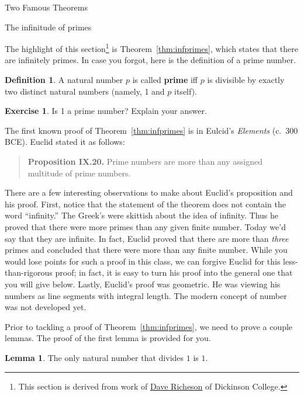 \documentclass[11pt]{article}
\theoremstyle{definition}
\newtheorem{definition}[theorem]{Definition}
\newtheorem{exercise}[theorem]{Exercise}
\newtheorem{lemma}[theorem]{Lemma}
\begin{document}
\addtocounter{section}{3}

\begin{section}{Two Famous Theorems}

\begin{subsection}{The infinitude of primes}

The highlight of this section\footnote{This section is derived from work of \href{http://users.dickinson.edu/~richesod/}{Dave Richeson} of Dickinson College.} is Theorem~\ref{thm:infprimes}, which states that there are infinitely primes. In case you forgot, here is the definition of a prime number.

\begin{definition}
A natural number $p$ is called \textbf{prime} iff $p$ is divisible by exactly two distinct natural numbers (namely, 1 and $p$ itself).
\end{definition}

\begin{exercise}
Is 1 a prime number?  Explain your answer.
\end{exercise}

The first known proof of Theorem~\ref{thm:infprimes} is in Eulcid's \emph{Elements} (c.\ 300 BCE). Euclid stated it as follows: 
\begin{quote}
\textbf{Proposition IX.20.} Prime numbers are more than any assigned multitude of prime numbers.
\end{quote}
There are a few interesting observations to make about Euclid's proposition and his proof. First, notice that the statement of the theorem does not contain the word ``infinity.'' The Greek's were skittish about the idea of infinity. Thus he proved that there were more primes than any given finite number. Today we'd say that they are infinite. In fact, Euclid proved that there are more than \emph{three} primes and concluded that there were more than any finite number. While you would lose points for such a proof in this class, we can forgive Euclid for this less-than-rigorous proof;  in fact, it is easy to turn his proof into the general one that you will give below. Lastly, Euclid's proof was geometric. He was viewing his numbers as line segments with integral length. The modern concept of number was not developed yet.

Prior to tackling a proof of Theorem~\ref{thm:infprimes}, we need to prove a couple lemmas.  The proof of the first lemma is provided for you. 

\begin{lemma}\label{lem:divisorsof1}
The only natural number that divides $1$ is $1$.  
\end{lemma}


\end{subsection}
\end{section}
\end{document}
